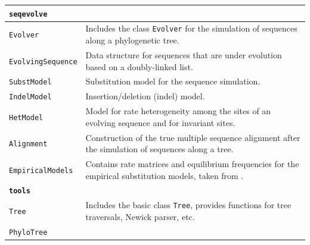 \documentclass[hidelinks,11pt]{article}
\begin{document}
{\begin{longtable}{| p{4.0cm} | p{10cm} |}
	\hline
	\multicolumn{2}{|l|}{\textbf{\texttt{seqevolve}}}\\
	\hline
	\texttt{Evolver} & 
	Includes the class \texttt{Evolver} for the simulation of sequences along a phylogenetic tree. \\
	\texttt{EvolvingSequence} & 
	Data structure for sequences that are under evolution based on a doubly-linked list. \\
	\texttt{SubstModel} & 
	Substitution model for the sequence simulation. \\
	\texttt{IndelModel} & 
	Insertion/deletion (indel) model. \\
	\texttt{HetModel} & 
	Model for rate heterogeneity among the sites of an evolving sequence and for invariant sites. \\
	\texttt{Alignment} & 
	Construction of the true multiple sequence alignment after the simulation of sequences along a tree. \\
	\texttt{EmpiricalModels} & 
	Contains rate matrices and equilibrium frequencies for the empirical substitution models, taken from \citep{criscuolo}. \\
	\hline
	\multicolumn{2}{|l|}{\textbf{\texttt{tools}}}\\
	\hline
	\texttt{Tree} & 
	Includes the basic class \texttt{Tree}, provides functions for tree traversals, Newick parser, etc. \\
	\texttt{PhyloTree} & 

\end{longtable}}
\end{document}
